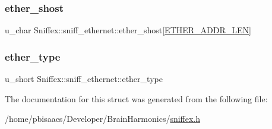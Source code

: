 \mbox{\label{structSniffex_1_1sniff__ethernet_af40407403f51872c064c28298441b2d9}} 
\subsubsection{\texorpdfstring{ether\+\_\+shost}{ether\_shost}}
{\footnotesize\ttfamily u\+\_\+char Sniffex\+::sniff\+\_\+ethernet\+::ether\+\_\+shost\mbox{[}\mbox{\hyperlink{sniffex_8h_abf4fcaacb1ad2010711b7c880ec2ed20}{E\+T\+H\+E\+R\+\_\+\+A\+D\+D\+R\+\_\+\+L\+EN}}\mbox{]}}

\mbox{\label{structSniffex_1_1sniff__ethernet_a31b8a8e9232feffeeb747f949580753a}} 
\subsubsection{\texorpdfstring{ether\+\_\+type}{ether\_type}}
{\footnotesize\ttfamily u\+\_\+short Sniffex\+::sniff\+\_\+ethernet\+::ether\+\_\+type}



The documentation for this struct was generated from the following file\+:\begin{DoxyCompactItemize}
\item 
/home/pbisaacs/\+Developer/\+Brain\+Harmonics/\mbox{\hyperlink{sniffex_8h}{sniffex.\+h}}\end{DoxyCompactItemize}
